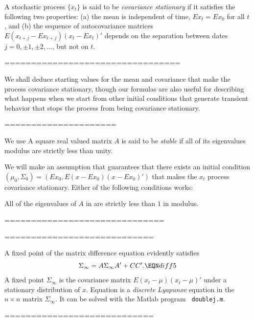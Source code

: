\medskip
  A stochastic process $\{x_t\}$ is said to
be {\it covariance stationary\/} if it
satisfies the following two properties: (a) the mean is
independent of time,
 $ E x_t = E x_0$ for all $t$,
 and (b) the sequence of autocovariance matrices
 $E(x_{t+j} - E x_{t+j})(x_t - E x_t)'$
depends on the separation between dates
 $j = 0, \pm 1, \pm 2, \ldots$, but not on $t$.
\enddefinition
\smallskip





=================================

 We shall deduce
starting values for the mean and covariance
that make the process covariance
stationary, though our formulas are also useful for describing
what happens when we start from other initial conditions that
generate transient behavior that stops the process from being covariance
stationary.

=====================


We use
A square real valued matrix $A$ is said to be {\it stable\/} if
all of its eigenvalues modulus   are strictly less than
unity.
\enddefinition
\smallskip

We will make an assumption that guarantees that there exists an initial
condition $(\mu_0, \Sigma_0) = (Ex_0, E(x - Ex_0) (x-Ex_0)')$  that makes
the $x_t$ process covariance stationary.
Either of the following conditions works:

\medskip
{}  All of the eigenvalues of $A$ in
 are strictly less than $1$ in modulus.




==============================


============================

A fixed point of the matrix difference equation  evidently  satisfies
$$ \Sigma_\infty = A \Sigma_\infty A' + C C' .  \EQN diff5 $$
A fixed point $ \Sigma_\infty  $
 is the covariance matrix $E (x_t -\mu) (x_t - \mu)'$ under  a stationary distribution of $x$.
%
Equation  is
a {\it discrete Lyapunov} equation in the $n \times n$ matrix
$\Sigma_\infty$.  It can be solved with the Matlab program {\tt
doublej.m}. %
%

============================


